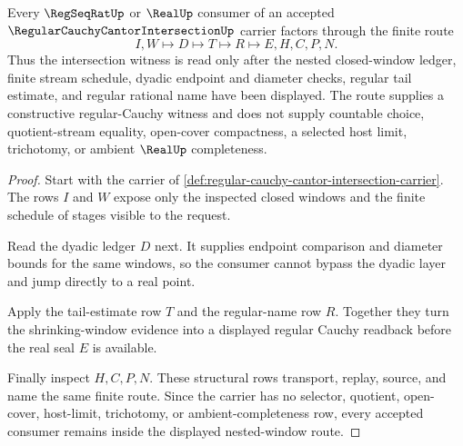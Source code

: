 \begin{theorem}
\label{thm:regular-cauchy-cantor-intersection-nested-window-route}
Every $\RegSeqRatUp$ or $\RealUp$ consumer of an accepted $\RegularCauchyCantorIntersectionUp$ carrier factors through the finite route
$$
I,W \longmapsto D \longmapsto T \longmapsto R \longmapsto E,H,C,P,N .
$$
Thus the intersection witness is read only after the nested closed-window ledger, finite stream schedule, dyadic endpoint and diameter checks, regular tail estimate, and regular rational name have been displayed. The route supplies a constructive regular-Cauchy witness and does not supply countable choice, quotient-stream equality, open-cover compactness, a selected host limit, trichotomy, or ambient $\RealUp$ completeness.
\end{theorem}
\begin{proof}
Start with the carrier of \autoref{def:regular-cauchy-cantor-intersection-carrier}. The rows $I$ and $W$ expose only the inspected closed windows and the finite schedule of stages visible to the request.

Read the dyadic ledger $D$ next. It supplies endpoint comparison and diameter bounds for the same windows, so the consumer cannot bypass the dyadic layer and jump directly to a real point.

Apply the tail-estimate row $T$ and the regular-name row $R$. Together they turn the shrinking-window evidence into a displayed regular Cauchy readback before the real seal $E$ is available.

Finally inspect $H,C,P,N$. These structural rows transport, replay, source, and name the same finite route. Since the carrier has no selector, quotient, open-cover, host-limit, trichotomy, or ambient-completeness row, every accepted consumer remains inside the displayed nested-window route.
\end{proof}

